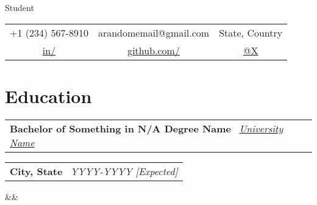 \documentclass[10pt,a4paper,garamond]{moderncv}
\makeatletter
\newcommand*{\customcventry}[7][.13em]{
\begin{tabular}{@{}l}
{\bfseries #4} \
{\itshape #3}
\end{tabular}
\hfill
\begin{tabular}{l@{}}
{\bfseries #5} \
{\itshape #2}
\end{tabular}
\ifx&#7&%
\else{\
\begin{minipage}{\maincolumnwidth}%
\small#7%
\end{minipage}}\fi%
\par\addvspace{#1}}
\makeatother
\begin{document}
\makecvtitle
\vspace*{-10mm}
\begin{center}{Student}\end{center}
\begin{center}
\begin{tabular}{ c c c }
\faPhone\enspace +1 (234) 567-8910 & \enspace\faEnvelope\enspace arandomemail@gmail.com & \enspace\faHome\enspace State, Country \\
\faLinkedin\enspace \color{black} \href{https://www.linkedin.com}{in/} &
\faGithub\enspace \color{black} \href{https://github.com/}{github.com/} & \enspace {\textit{$\mathbb{X}$}}\enspace \color{black} \href{https://x.com/}{@X}
\end{tabular}
\end{center}



\vspace*{-5.5mm}

\section{Education}
\customcventry{YYYY-YYYY [Expected]}{\color{black}\href{https://www.google.com/}{University Name}}{\textnormal{Bachelor of Something in N/A} Degree Name}{City, State}{}{}


\end{document}
